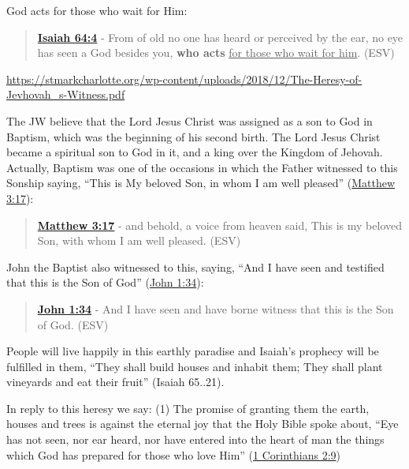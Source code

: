 \documentclass[11pt]{article}
\begin{document}
God acts for those who wait for Him:

\begin{quote}
\textbf{\href{https://www.biblegateway.com/passage/?search=Isaiah\%2064\%3A4\&version=ESV}{Isaiah 64:4}} - From of old no one has heard or perceived by the ear, no eye has seen a God besides you, \textbf{who acts} \uline{for those who wait for him}. (ESV)
\end{quote}

\url{https://stmarkcharlotte.org/wp-content/uploads/2018/12/The-Heresy-of-Jevhovah\_s-Witness.pdf}

The JW believe that the Lord Jesus Christ was assigned as a son
to God in Baptism, which was the beginning of his second birth.
The Lord Jesus Christ became a spiritual son to God in it, and a
king over the Kingdom of Jehovah. Actually, Baptism was one
of the occasions in which the Father witnessed to this Sonship
saying, “This is My beloved Son, in whom I am well pleased”
(\href{https://www.biblegateway.com/passage/?search=Matthew\%203\%3A17\&version=ESV}{Matthew 3:17}):

\begin{quote}
\textbf{\href{https://www.biblegateway.com/passage/?search=Matthew\%203\%3A17\&version=ESV}{Matthew 3:17}} - and behold, a voice from heaven said, This is my beloved Son, with whom I am well pleased. (ESV)
\end{quote}

John the Baptist also witnessed to this, saying,
“And I have seen and testified that this is the Son of God”
(\href{https://www.biblegateway.com/passage/?search=John\%201\%3A34\&version=ESV}{John 1:34}):

\begin{quote}
\textbf{\href{https://www.biblegateway.com/passage/?search=John\%201\%3A34\&version=ESV}{John 1:34}} - And I have seen and have borne witness that this is the Son of God. (ESV)
\end{quote}

People will live happily in this earthly paradise and Isaiah’s
prophecy will be fulfilled in them, “They shall build houses
and inhabit them; They shall plant vineyards and eat their
fruit” (Isaiah 65..21).

In reply to this heresy we say:
(1) The promise of granting them the earth, houses and trees is
against the eternal joy that the Holy Bible spoke about, “Eye
has not seen, nor ear heard, nor have entered into the heart of
man the things which God has prepared for those who love
Him” (\href{https://www.biblegateway.com/passage/?search=1\%20Corinthians\%202\%3A9\&version=ESV}{1 Corinthians 2:9})
\end{document}
